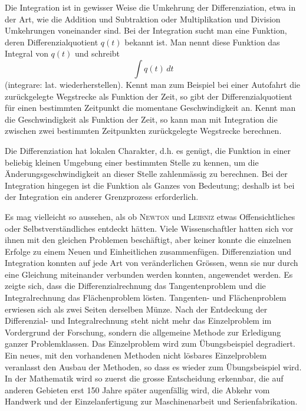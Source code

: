 \documentclass[%
11pt,%
twoside,%
titlepage,%
german,%
headsepline%
]{scrartcl}
\begin{document}
Die Integration ist in gewisser Weise die Umkehrung der Differenziation, etwa in der Art, wie die Addition und Subtraktion oder Multiplikation und Division Umkehrungen voneinander sind. Bei der Integration sucht man eine Funktion, deren Differenzialquotient $q(t)$ bekannt ist. Man nennt diese Funktion das Integral von $q(t)$ und
schreibt
$$\int q(t)\,dt$$
(integrare: lat. wiederherstellen).
Kennt man zum Beispiel bei einer Autofahrt die zur\"uckgelegte Wegstrecke als Funktion der Zeit, so gibt der Differenzialquotient f\"ur einen bestimmten Zeitpunkt die momentane Geschwindigkeit an. Kennt man die Geschwindigkeit als Funktion der Zeit, so kann man mit Integration die zwischen zwei bestimmten Zeitpunkten zur\"uckgelegte Wegstrecke berechnen.

Die Differenziation hat lokalen Charakter, d.h. es gen\"ugt, die Funktion in einer beliebig kleinen Umgebung einer bestimmten Stelle zu kennen, um die \"Anderungsgeschwindigkeit an dieser Stelle zahlenm\"assig zu berechnen. Bei der Integration hingegen ist die Funktion als Ganzes von Bedeutung; deshalb ist bei der Integration ein anderer Grenzprozess erforderlich.

Es mag vielleicht so aussehen, als ob \textsc{Newton} und \textsc{Leibniz} etwas Offensichtliches oder Selbstverst\"andliches entdeckt h\"atten. Viele Wissenschaftler hatten sich vor ihnen mit den gleichen Problemen besch\"aftigt, aber keiner konnte die einzelnen Erfolge zu einem Neuen und Einheitlichen zusammenf\"ugen. Differenziation und Integration konnten auf jede Art von ver\"anderlichen Gr\"ossen, wenn sie nur durch eine Gleichung miteinander verbunden werden konnten, angewendet werden. Es zeigte sich, dass die Differenzialrechnung das Tangentenproblem und die Integralrechnung das Fl\"achenproblem l\"osten. Tangenten- und Fl\"achenproblem erwiesen sich als zwei Seiten derselben M\"unze.
Nach der Entdeckung der Differenzial- und Integralrechnung steht nicht mehr das Einzelproblem im Vordergrund der Forschung, sondern die allgemeine Methode zur Erledigung ganzer Problemklassen. Das Einzelproblem wird zum \"Ubungsbeispiel degradiert. Ein neues, mit den vorhandenen Methoden nicht l\"osbares Einzelproblem veranlasst den Ausbau der Methoden, so dass es wieder zum \"Ubungsbeispiel wird. In der Mathematik wird so zuerst die grosse Entscheidung erkennbar, die auf anderen Gebieten erst 150 Jahre sp\"ater augenf\"allig wird, die Abkehr vom Handwerk und der Einzelanfertigung zur Maschinenarbeit und Serienfabrikation.
\end{document}
